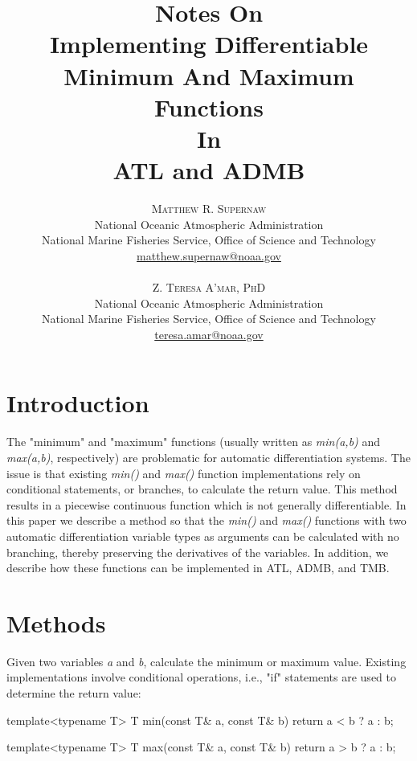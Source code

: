 \documentclass[oneside]{article}
\title{\vspace{-15mm}\fontsize{24pt}{24pt}\selectfont\textbf{Notes On \protect\\  Implementing Differentiable  \protect\\ Minimum And Maximum Functions \protect\\
In \protect\\
ATL and  ADMB}} %
\author{
\large
\textsc{Matthew R. Supernaw}\\[2mm] %
\normalsize National Oceanic Atmospheric Administration \\ %
\normalsize National Marine Fisheries Service, Office of Science and Technology\\ %
\normalsize \href{mailto:matthew.supernaw@noaa.gov}{matthew.supernaw@noaa.gov} \\ %
\\
\textsc{Z. Teresa A'mar, PhD}\\[2mm] %
\normalsize National Oceanic Atmospheric Administration \\ %
\normalsize National Marine Fisheries Service, Office of Science and Technology\\ %
\normalsize \href{mailto:teresa.amar@noaa.gov}{teresa.amar@noaa.gov} \\%
\vspace{-5mm}
}
\date{}
\begin{document}
\maketitle %

\thispagestyle{fancy} %


%
%
%


\newpage
\tableofcontents
\newpage

\section{Introduction}

The "minimum" and "maximum" functions (usually written as \textit{min(a,b)} and \textit{max(a,b)}, respectively) are problematic for automatic differentiation systems. The issue is that existing \textit{min()} and \textit{max()} function implementations rely on conditional statements, or branches, to calculate the return value. This method results in a piecewise continuous function which is not generally differentiable.  In this paper we describe a method so that the \textit{min()} and \textit{max()} functions with two automatic differentiation variable types as arguments can be calculated with no branching, thereby preserving the derivatives of the variables. In addition, we describe how these functions can be implemented in ATL, ADMB, and TMB.


\section{Methods}

Given two variables \textit{a} and \textit{b}, calculate the minimum or maximum value. Existing implementations involve conditional operations, i.e., "if" statements are used to determine the return value:

\begin{cppsource}
template<typename T>
T min(const T& a, const T& b){
   return a < b ? a : b;
}

template<typename T>
T max(const T& a, const T& b){
   return a > b ? a : b;
}

\end{cppsource}
\end{document}
